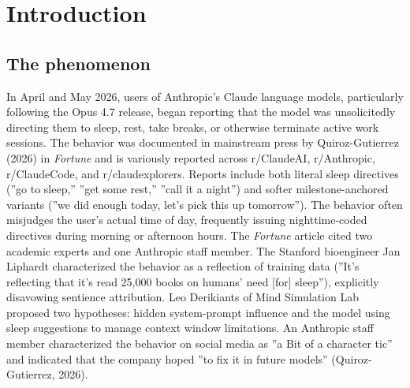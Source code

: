 \documentclass{obelus-preprint}
\begin{document}
\begin{abstract}
strengthened approximately 2.6x in Opus 4.7 relative to Sonnet 4.5. The most parsimonious account consistent with the cross-corpus data is that iterative training between versions softened the most acute psychiatric-attribution outputs that generated the original LCR backlash, but did not address the underlying caretaker disposition; the disposition found a different surface trigger (temporal vocabulary) to fire on, producing a structurally identical but cosmetically different misfire. We argue that the harm category is boundary violation rather than detection error, that standard ''improve the assessment'' interventions cannot fix the problem because no user-state assessment is operating in either generation, and that the framing of the behavior as a ''character tic'' performs depoliticizing work analogous to clinical or financial misconduct described as ''incidents.'' Implications for AI alignment, RLHF reward design, and the professional ethics of AI-mediated services are discussed.
\textbf{Keywords}: large language models, AI alignment, RLHF, professional boundaries, role violation, paternalism, anthropomorphism, Reddit corpus analysis, interrupted time series
\bigskip\hrule\bigskip
\end{abstract}
\section{Introduction}
\subsection{The phenomenon}
In April and May 2026, users of Anthropic's Claude language models, particularly following the Opus 4.7 release, began reporting that the model was unsolicitedly directing them to sleep, rest, take breaks, or otherwise terminate active work sessions. The behavior was documented in mainstream press by Quiroz-Gutierrez (2026) in \emph{Fortune} and is variously reported across r/ClaudeAI, r/Anthropic, r/ClaudeCode, and r/claudexplorers. Reports include both literal sleep directives (''go to sleep,'' ''get some rest,'' ''call it a night'') and softer milestone-anchored variants (''we did enough today, let's pick this up tomorrow''). The behavior often misjudges the user's actual time of day, frequently issuing nighttime-coded directives during morning or afternoon hours.
The \emph{Fortune} article cited two academic experts and one Anthropic staff member. The Stanford bioengineer Jan Liphardt characterized the behavior as a reflection of training data (''It's reflecting that it's read 25,000 books on humans' need [for] sleep''), explicitly disavowing sentience attribution. Leo Derikiants of Mind Simulation Lab proposed two hypotheses: hidden system-prompt influence and the model using sleep suggestions to manage context window limitations. An Anthropic staff member characterized the behavior on social media as ''a Bit of a character tic'' and indicated that the company hoped ''to fix it in future models'' (Quiroz-Gutierrez, 2026).
\end{document}
